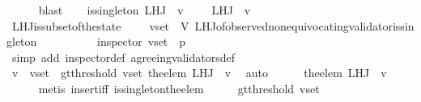 \begin{isabellebody}
\ \ \ \ \isamarkupfalse%
\ blast\isanewline
\ \ \isamarkupfalse%
\ {\isachardoublequoteopen}is{\isacharunderscore}singleton\ {\isacharparenleft}L{\isacharunderscore}H{\isacharunderscore}J\ {\isasymsigma}\ v{\isacharparenright}\ {\isasymand}\ {\isacharparenleft}{\isasymforall}\ {\isasymsigma}{\isacharprime}\ {\isasymin}\ L{\isacharunderscore}H{\isacharunderscore}J\ {\isasymsigma}\ v{\isachardot}\ {\isasymsigma}{\isacharprime}\ {\isasymsubseteq}\ {\isasymsigma}{\isacharparenright}{\isachardoublequoteclose}\isanewline
\ \ \ \ \isamarkupfalse%
\ L{\isacharunderscore}H{\isacharunderscore}J{\isacharunderscore}is{\isacharunderscore}subset{\isacharunderscore}of{\isacharunderscore}the{\isacharunderscore}state\ {\isacartoucheopen}{\isasymsigma}\ {\isasymin}\ {\isasymSigma}\ {\isasymand}\ v{\isacharunderscore}set\ {\isasymsubseteq}\ V{\isacartoucheclose}\ L{\isacharunderscore}H{\isacharunderscore}J{\isacharunderscore}of{\isacharunderscore}observed{\isacharunderscore}non{\isacharunderscore}equivocating{\isacharunderscore}validator{\isacharunderscore}is{\isacharunderscore}singleton\isanewline
\ \ \ \ \ \ \ \ \ \ {\isacartoucheopen}inspector\ {\isacharparenleft}v{\isacharunderscore}set{\isacharcomma}\ {\isasymsigma}{\isacharcomma}\ p{\isacharparenright}{\isacartoucheclose}\ \isanewline
\ \ \ \ \isamarkupfalse%
\ {\isacharparenleft}simp\ add{\isacharcolon}\ inspector{\isacharunderscore}def\ agreeing{\isacharunderscore}validators{\isacharunderscore}def{\isacharparenright}\isanewline
\ \ \ \ \isamarkupfalse%
\ {\isacartoucheopen}v\ {\isasymin}\ v{\isacharunderscore}set\ {\isasymand}\ gt{\isacharunderscore}threshold\ {\isacharparenleft}v{\isacharunderscore}set{\isacharcomma}\ the{\isacharunderscore}elem\ {\isacharparenleft}L{\isacharunderscore}H{\isacharunderscore}J\ {\isasymsigma}\ v{\isacharparenright}{\isacharparenright}{\isacartoucheclose}\ \isamarkupfalse%
\ auto\ \ \isanewline
\ \ \isamarkupfalse%
\ {\isachardoublequoteopen}the{\isacharunderscore}elem\ {\isacharparenleft}L{\isacharunderscore}H{\isacharunderscore}J\ {\isasymsigma}\ v{\isacharparenright}\ {\isasymsubseteq}\ {\isasymsigma}{\isachardoublequoteclose}\isanewline
\ \ \ \ \isamarkupfalse%
\ {\isacharparenleft}metis\ insert{\isacharunderscore}iff\ is{\isacharunderscore}singleton{\isacharunderscore}the{\isacharunderscore}elem{\isacharparenright}\isanewline
\ \ \isamarkupfalse%
\ \isamarkupfalse%
\ {\isachardoublequoteopen}gt{\isacharunderscore}threshold\ {\isacharparenleft}v{\isacharunderscore}set{\isacharcomma}\ {\isasymsigma}{\isacharparenright}{\isachardoublequoteclose}\isanewline

\end{isabellebody}
